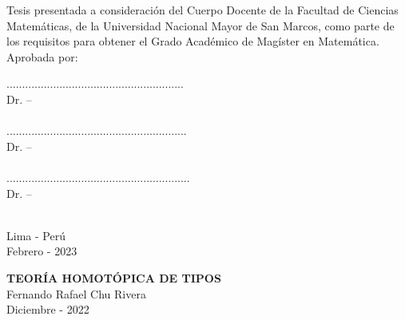 \documentclass[12pt]{report}
\theoremstyle{definition}
\theoremstyle{plain}
\newenvironment{dedication}
  {\clearpage           %
   \thispagestyle{empty}%
   \vspace*{\stretch{1}}%
   \itshape             %
   \raggedleft          %
  }
  {\par %
   \vspace{\stretch{3}} %
   \clearpage           %
  }
\begin{document}
Tesis presentada a consideraci\'on del Cuerpo Docente de la Facultad de Ciencias Matem\'aticas, de la Universidad Nacional Mayor de San Marcos, como parte de los requisitos para obtener el Grado Acad\'emico de Mag\'ister en Matem\'atica.\\

Aprobada por:\\
\vspace{2cm}

\begin{center}
    .........................................................\\
    Dr. -- \\
    \quad    \\[1.5cm]
    ..........................................................\\
    Dr. -- \\
    \quad  \\[1.5cm]
    ...........................................................\\
    Dr. -- \\
    \quad  \\[1.5cm]
\end{center}

\vfill
\begin{center}
    Lima - Per\'u \\ Febrero - 2023
\end{center}



\newpage
{}
\begin{center}
    \textbf{TEOR\'IA HOMOT\'OPICA DE TIPOS} \\[0.4cm]
    Fernando Rafael Chu Rivera \\[0.4cm]
    Diciembre - 2022 \\[0.7cm]
\end{center}
\end{document}
